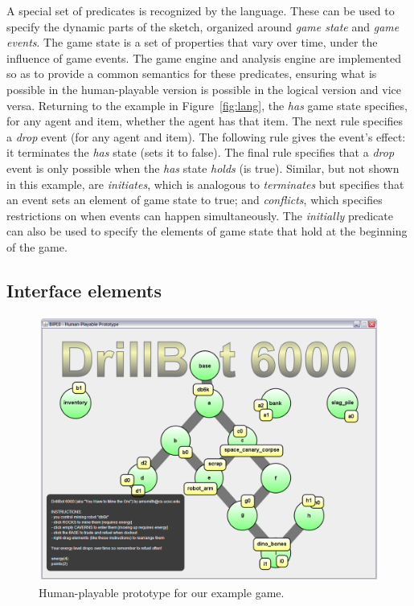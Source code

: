 \documentclass[letterpaper]{article}
\begin{document}
A special set of predicates is recognized by the language. These can be used to
specify the dynamic parts of the sketch, organized around \emph{game state} and
\emph{game events}.  The game state is a set of properties that vary over time,
under the influence of game events.  The game engine and analysis engine are
implemented so as to provide a common semantics for these predicates, ensuring
what is possible in the human-playable version is possible in the logical
version and vice versa.  Returning to the example in Figure~\ref{fig:lang}, the
\emph{has} game state specifies, for any agent and item, whether the agent has
that item.  The next rule specifies a \emph{drop} event (for any agent and
item). The following rule gives the event's effect: it terminates the
\emph{has} state (sets it to false). The final rule specifies that a
\emph{drop} event is only possible when the \emph{has} state \emph{holds} (is
true).  Similar, but not shown in this example, are \emph{initiates}, which is
analogous to \emph{terminates} but specifies that an event sets an element of
game state to true; and \emph{conflicts}, which specifies restrictions on when
events can happen simultaneously. The \emph{initially} predicate can also be
used to specify the elements of game state that hold at the beginning of the
game.

\subsection{Interface elements}

\begin{figure}
\includegraphics[width=\columnwidth]{db6k_screenshot.png}
\caption{Human-playable prototype for our example game.}
\label{fig:screenshot}
\end{figure}
\end{document}
